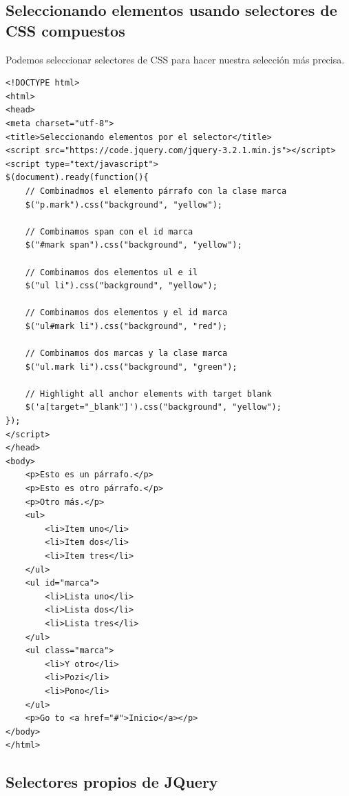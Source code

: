 \documentclass[a4paper, oneside]{article}
\begin{document}
\subsection{Seleccionando elementos usando selectores de CSS compuestos}
\label{sec:org8d83dc2}

Podemos seleccionar selectores de CSS para hacer nuestra selección más precisa.

\begin{verbatim}
<!DOCTYPE html>
<html>
<head>
<meta charset="utf-8">
<title>Seleccionando elementos por el selector</title>
<script src="https://code.jquery.com/jquery-3.2.1.min.js"></script>
<script type="text/javascript">
$(document).ready(function(){
    // Combinadmos el elemento párrafo con la clase marca
    $("p.mark").css("background", "yellow");

    // Combinamos span con el id marca
    $("#mark span").css("background", "yellow");

    // Combinamos dos elementos ul e il
    $("ul li").css("background", "yellow");

    // Combinamos dos elementos y el id marca
    $("ul#mark li").css("background", "red");

    // Combinamos dos marcas y la clase marca
    $("ul.mark li").css("background", "green");

    // Highlight all anchor elements with target blank
    $('a[target="_blank"]').css("background", "yellow");
});
</script>
</head>
<body>
    <p>Esto es un párrafo.</p>
    <p>Esto es otro párrafo.</p>
    <p>Otro más.</p>
    <ul>
        <li>Item uno</li>
        <li>Item dos</li>
        <li>Item tres</li>
    </ul>
    <ul id="marca">
        <li>Lista uno</li>
        <li>Lista dos</li>
        <li>Lista tres</li>
    </ul>
    <ul class="marca">
        <li>Y otro</li>
        <li>Pozi</li>
        <li>Pono</li>
    </ul>
    <p>Go to <a href="#">Inicio</a></p>
</body>
</html>                                		
\end{verbatim}

\subsection{Selectores propios de JQuery}
\label{sec:orgd13f46b}
\end{document}
